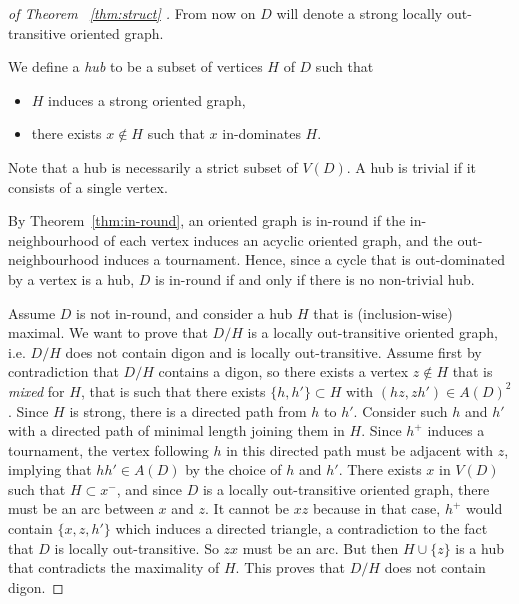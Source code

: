 \begin{proof}[of Theorem ~\ref{thm:struct} ]

From now on $D$ will denote a strong  locally out-transitive oriented graph. 

We define a {\em hub}  to be a subset of vertices $H$ of $D$ such that 
\begin{itemize}
\item $H$ induces a strong oriented graph,
\item there exists $x\notin H$ such that $x$ in-dominates $H$.
\end{itemize}

Note that a hub is necessarily a strict subset of $V(D)$.
A hub is trivial if it consists of a single vertex.

By Theorem~\ref{thm:in-round}, an oriented graph is in-round if the in-neighbourhood of each vertex induces an acyclic oriented graph, and the out-neighbourhood induces a tournament. Hence, since a cycle that is out-dominated by a vertex is a hub, $D$ is in-round if and only if there is no non-trivial hub. 

Assume $D$ is not in-round, and consider a hub $H$ that is (inclusion-wise) maximal. We want to prove that $D/H$ is a locally out-transitive oriented graph, i.e. $D/H$ does not contain digon and is  locally out-transitive. 
Assume first by contradiction that $D/H$ contains a digon, so there exists a vertex $z\notin H$ that is {\em mixed} for $H$, that is such that there exists $\{h,h'\}\subset H$ with $(hz,zh')\in A(D)^{2}$.
Since $H$ is strong, there is a directed path from $h$ to $h'$.  Consider such $h$ and $h'$ with a directed path of minimal length joining them in $H$. 
Since $h^+$ induces a  tournament, the vertex following $h$ in this directed path must be adjacent with $z$, implying that $hh' \in A(D)$ by the choice of $h$ and $h'$. 
There exists $x$ in $V(D)$ such that $H\subset x^{-}$, and since $D$ is a locally out-transitive oriented graph, there must be an arc between $x$ and $z$. 
It cannot be $xz$ because in that case, $h^+$ would contain $\{x,z,h'\}$ which induces a directed triangle, a contradiction to the fact that $D$ is locally out-transitive. 
So $zx$ must be an arc. But then $H\cup\{z\}$ is a hub that contradicts the maximality of $H$. This proves that $D/H$ does not contain digon.  


\end{proof}
